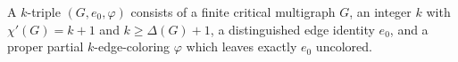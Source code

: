 \begin{definition}
A $k$-triple $(G,e_0,\varphi)$ consists of a finite critical multigraph
$G$, an integer $k$ with $\chi'(G)=k+1$ and
$k\geq\Delta(G)+1$, a distinguished edge identity $e_0$, and a proper
partial $k$-edge-coloring $\varphi$ which leaves exactly $e_0$ uncolored.
\end{definition}
